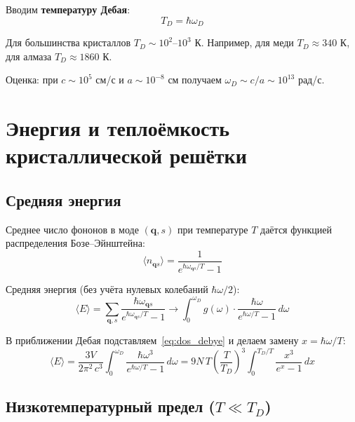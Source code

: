 \documentclass[../general/general]{subfiles}
\begin{document}
Вводим \textbf{температуру Дебая}:
\begin{equation}
    T_D = \hbar\omega_D
\end{equation}

Для большинства кристаллов $T_D \sim 10^2$--$10^3$ К. Например, для меди $T_D \approx 340$ К, для алмаза $T_D \approx 1860$ К.

Оценка: при $c \sim 10^5$ см/с и $a \sim 10^{-8}$ см получаем $\omega_D \sim c/a \sim 10^{13}$ рад/с.



\section{Энергия и теплоёмкость кристаллической решётки}

\subsection{Средняя энергия}

Среднее число фононов в моде $(\mathbf{q},s)$ при температуре $T$ даётся функцией распределения Бозе--Эйнштейна:
\begin{equation}
    \langle n_{\mathbf{q}s}\rangle = \frac{1}{e^{\hbar\omega_{\mathbf{q}s}/T} - 1}
\end{equation}

Средняя энергия (без учёта нулевых колебаний $\hbar\omega/2$):
\begin{equation}
    \langle E\rangle = \sum_{\mathbf{q},s} \frac{\hbar\omega_{\mathbf{q}s}}{e^{\hbar\omega_{\mathbf{q}s}/T} - 1} \longrightarrow \int_0^{\omega_D} g(\omega)\cdot\frac{\hbar\omega}{e^{\hbar\omega/T}-1}\,d\omega
\end{equation}

В приближении Дебая подставляем~\eqref{eq:dos_debye} и делаем замену $x = \hbar\omega/T$:
\begin{equation}
    \langle E\rangle = \frac{3V}{2\pi^2\,c^3}\int_0^{\omega_D}\frac{\hbar\omega^3}{e^{\hbar\omega/T}-1}\,d\omega = 9N\,T\!\left(\frac{T}{T_D}\right)^{\!3}\int_0^{T_D/T}\frac{x^3}{e^x-1}\,dx
    \label{eq:E_debye}
\end{equation}

\subsection{Низкотемпературный предел ($T \ll T_D$)}
\end{document}
